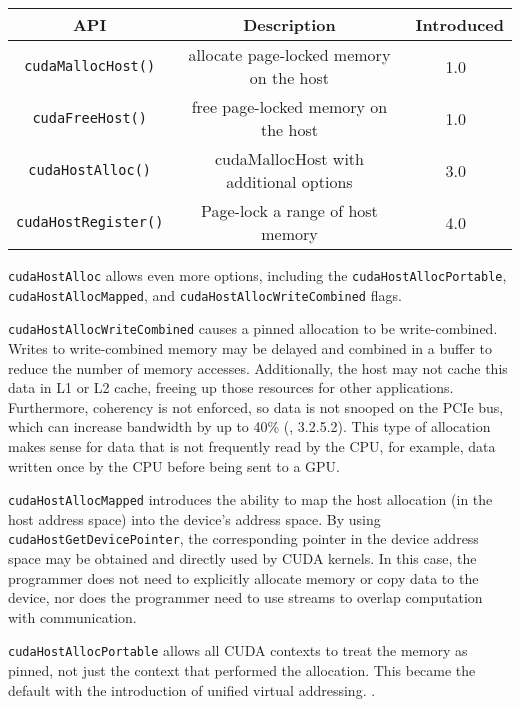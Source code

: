 \begin{table}[h]
	\centering
	\caption[CUDA Pinned Memory-Management APIs]{}
	\label{tab:cuda-pinned-apis}
	\begin{tabular}{|c|c|c|}
		\hline
		\textbf{API}                & \textbf{Description}                    & \textbf{Introduced} \\ \hline
		\texttt{cudaMallocHost()}   & allocate page-locked memory on the host & 1.0~\cite{nvidia2007cuda10} \\ \hline
		\texttt{cudaFreeHost()}     & free page-locked memory on the host     & 1.0~\cite{nvidia2007cuda10} \\ \hline
		\texttt{cudaHostAlloc()}    & cudaMallocHost with additional options  & 3.0~\cite{nvidia2010cuda30} \\ \hline
		\texttt{cudaHostRegister()} & Page-lock a range of host memory        & 4.0~\cite{nvidia2011cuda40} \\ \hline
	\end{tabular}
\end{table}

\texttt{cudaHostAlloc} allows even more options, including the \texttt{cudaHostAllocPortable}, \texttt{cudaHostAllocMapped}, and \texttt{cudaHostAllocWriteCombined} flags.

\texttt{cudaHostAllocWriteCombined} causes a pinned allocation to be write-combined.
Writes to write-combined memory may be delayed and combined in a buffer to reduce the number of memory accesses.
Additionally, the host may not cache this data in L1 or L2 cache, freeing up those resources for other applications. 
Furthermore, coherency is not enforced, so data is not snooped on the PCIe bus, which can increase bandwidth by up to 40\% (\cite{nvidia2010cuda30}, 3.2.5.2).
This type of allocation makes sense for data that is not frequently read by the CPU, for example, data written once by the CPU before being sent to a GPU.

\texttt{cudaHostAllocMapped} introduces the ability to map the host allocation (in the host address space) into the device's address space.
By using \texttt{cudaHostGetDevicePointer}, the corresponding pointer in the device address space may be obtained and directly used by CUDA kernels.
In this case, the programmer does not need to explicitly allocate memory or copy data to the device, nor does the programmer need to use streams to overlap computation with communication.

\texttt{cudaHostAllocPortable} allows all CUDA contexts to treat the memory as pinned, not just the context that performed the allocation.
This became the default with the introduction of unified virtual addressing. .

